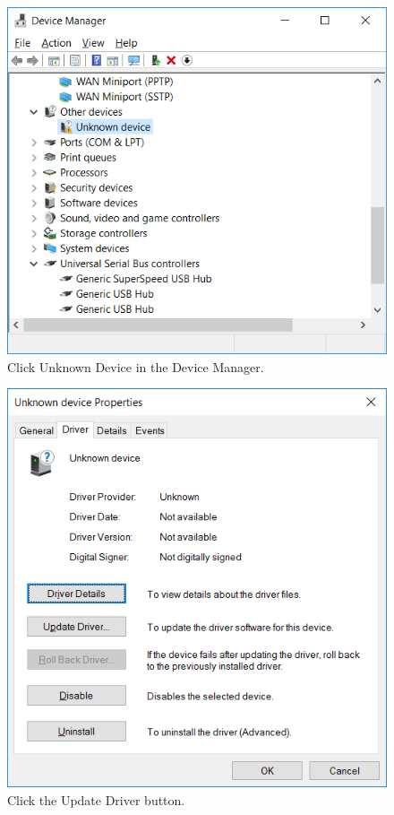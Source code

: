 \documentclass[11pt, twoside, pdftex]{article}
\begin{document}
\begin{figure}[H]
	\begin{center}
		\includegraphics[scale=0.65]{figures/figure8.png}
		\caption{Click Unknown Device in the Device Manager.} 
		\label{fig:8}
	\end{center}
\end{figure}

\begin{figure}[H]
	\begin{center}
		\includegraphics[scale=0.65]{figures/figure9.png}
		\caption{Click the Update Driver button.} 
		\label{fig:9}
	\end{center}
\end{figure}
\end{document}
